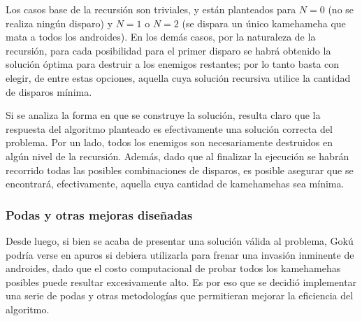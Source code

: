     Los casos base de la recursión son triviales, y están planteados para $N = 0$ (no se realiza ningún disparo) y $N =1$ o $N = 2$ (se dispara un único kamehameha que mata a todos los androides). En los demás casos, por la naturaleza de la recursión, para cada posibilidad para el primer disparo se habrá obtenido la solución óptima para destruir a los enemigos restantes; por lo tanto basta con elegir, de entre estas opciones, aquella cuya solución recursiva utilice la cantidad de disparos mínima.

    Si se analiza la forma en que se construye la solución, resulta claro que la respuesta del algoritmo planteado es efectivamente una solución correcta del problema. Por un lado, todos los enemigos son necesariamente destruidos en algún nivel de la recursión. Además, dado que al finalizar la ejecución se habrán recorrido todas las posibles combinaciones de disparos, es posible asegurar que se encontrará, efectivamente, aquella cuya cantidad de kamehamehas sea mínima. 

    \subsubsection{Podas y otras mejoras diseñadas}

    Desde luego, si bien se acaba de presentar una solución válida al problema, Gokú podría verse en apuros si debiera utilizarla para frenar una invasión inminente de androides, dado que el costo computacional de probar todos los kamehamehas posibles puede resultar excesivamente alto. Es por eso que se decidió implementar una serie de podas y otras metodologías que permitieran mejorar la eficiencia del algoritmo.


